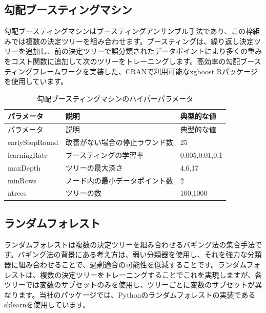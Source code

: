 \documentclass[
  11pt]{book}
\theoremstyle{definition}
\theoremstyle{definition}
\theoremstyle{definition}
\theoremstyle{definition}
\theoremstyle{remark}
\begin{document}
\subsection{勾配ブースティングマシン}\label{ux52feux914dux30d6ux30fcux30b9ux30c6ux30a3ux30f3ux30b0ux30deux30b7ux30f3}

勾配ブースティングマシンはブースティングアンサンブル手法であり、この枠組みでは複数の決定ツリーを組み合わせます。ブースティングは、繰り返し決定ツリーを追加し、前の決定ツリーで誤分類されたデータポイントにより多くの重みをコスト関数に追加して次のツリーをトレーニングします。高効率の勾配ブースティングフレームワークを実装した、CRANで利用可能なxgboost Rパッケージを使用しています。  

\begin{longtable}[]{@{}lll@{}}
\caption{\label{tab:gbmParameters} 勾配ブースティングマシンのハイパーパラメータ}\tabularnewline
\toprule\noalign{}
パラメータ & 説明 & 典型的な値 \\
\midrule\noalign{}
\endfirsthead
\toprule\noalign{}
パラメータ & 説明 & 典型的な値 \\
\midrule\noalign{}
\endhead
\bottomrule\noalign{}
\endlastfoot
earlyStopRound & 改善がない場合の停止ラウンド数 & 25 \\
learningRate & ブースティングの学習率 & 0.005,0.01,0.1 \\
maxDepth & ツリーの最大深さ & 4,6,17 \\
minRows & ノード内の最小データポイント数 & 2 \\
ntrees & ツリーの数 & 100,1000 \\
\end{longtable}

\subsection{ランダムフォレスト}\label{ux30e9ux30f3ux30c0ux30e0ux30d5ux30a9ux30ecux30b9ux30c8}

ランダムフォレストは複数の決定ツリーを組み合わせるバギング法の集合手法です。バギング法の背景にある考え方は、弱い分類器を使用し、それを強力な分類器に組み合わせることで、過剰適合の可能性を低減することです。ランダムフォレストは、複数の決定ツリーをトレーニングすることでこれを実現しますが、各ツリーでは変数のサブセットのみを使用し、ツリーごとに変数のサブセットが異なります。当社のパッケージでは、Pythonのランダムフォレストの実装であるsklearnを使用しています。   
\end{document}
